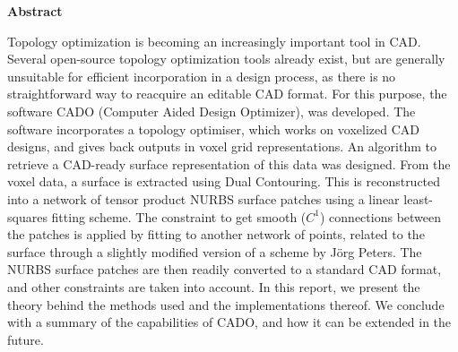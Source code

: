 

\clearemptydoublepage
{}
{}	





\vspace*{2cm}
\begin{center}
{\Large \bf Abstract}
\end{center}
\vspace{1cm}

Topology optimization is becoming an increasingly important tool in CAD. Several open-source topology optimization tools already exist, but are generally unsuitable for efficient incorporation in a design process, as there is no straightforward way to reacquire an editable CAD format. For this purpose, the software CADO (Computer Aided Design Optimizer), was developed. The software incorporates a topology optimiser, which works on voxelized CAD designs, and gives back outputs in voxel grid representations. An algorithm to retrieve a CAD-ready surface representation of this data was designed. From the voxel data, a surface is extracted using Dual Contouring. This is reconstructed into a network of tensor product NURBS surface patches using a linear least-squares fitting scheme. The constraint to get smooth ($C^1$) connections between the patches is applied by fitting to another network of points, related to the surface through a slightly modified version of a scheme by J\"{o}rg Peters. The NURBS surface patches are then readily converted to a standard CAD format, and other constraints are taken into account. In this report, we present the theory behind the methods used and the implementations thereof. We conclude with a summary of the capabilities of CADO, and how it can be extended in the future.
%
%
